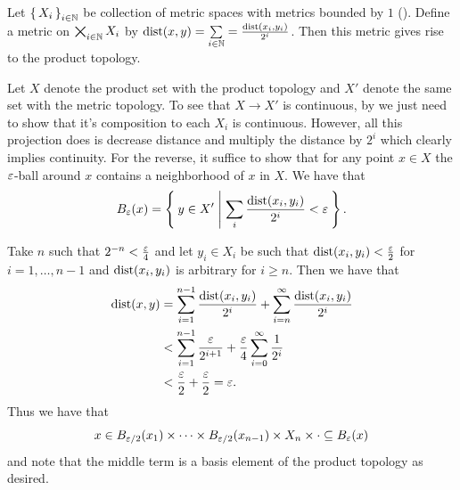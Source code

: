 \documentclass[letterpaper, 11pt, oneside]{book}
\begin{document}
\begin{prop}\label{prop: bounded_metrics_prod_top}
  Let $\set{X_{i}}_{i \in \mathbb{N}}$ be collection of metric spaces with metrics bounded by $1$ ().
  Define a metric on $\bigtimes_{i \in \mathbb{N}} X_{i}$ by $\operatorname{dist}(x, y) = \sum\limits_{i \in \mathbb{N}} = \frac{\operatorname{dist}(x_{i}, y_{i})}{2^{i}}$.
  Then this metric gives rise to the product topology.
\end{prop}
\begin{pf}
  Let $X$ denote the product set with the product topology and $X'$ denote the same set with the metric topology.
  To see that $X \to X'$ is continuous, by  we just need to show that it's composition to each $X_{i}$ is continuous.
  However, all this projection does is decrease distance and multiply the distance by $2^{i}$ which clearly implies continuity.
  For the reverse, it suffice to show that for any point $x \in X$ the $\varepsilon$-ball around $x$ contains a neighborhood of $x$ in $X$.
  We have that
  \[
    B_{\varepsilon}(x) = \Set{y \in X' | \sum_{i} \frac{\operatorname{dist}(x_{i}, y_{i})}{2^{i}} < \varepsilon}.
  \]

  \clearpage

  Take $n$ such that $2^{-n} < \frac{\varepsilon}{4}$ and let $y_{i} \in X_{i}$ be such that $\operatorname{dist}(x_{i}, y_{i}) < \frac{\varepsilon}{2}$ for $i = 1, \ldots, n - 1$ and $\operatorname{dist}(x_{i}, y_{i})$ is arbitrary for $i \geq n$.
  Then we have that
  \begin{align*}
    \operatorname{dist}(x, y) &= \sum_{i = 1}^{n - 1} \frac{\operatorname{dist}(x_{i}, y_{i})}{2^{i}} + \sum_{i = n}^{\infty} \frac{\operatorname{dist}(x_{i}, y_{i})}{2^{i}} \\
                &< \sum_{i = 1}^{n - 1} \frac{\varepsilon}{2^{i + 1}} + \frac{\varepsilon}{4} \sum_{i = 0}^{\infty} \frac{1}{2^{i}} \\
                &< \frac{\varepsilon}{2} + \frac{\varepsilon}{2} = \varepsilon.
  \end{align*}
  Thus we have that
  \[
    x \in B_{\varepsilon/2}(x_{1}) \times \cdots \times B_{\varepsilon/2}(x_{n - 1}) \times X_{n} \times \cdot \subseteq B_{\varepsilon}(x)
  \]
  and note that the middle term is a basis element of the product topology as desired.
\end{pf}
\end{document}
